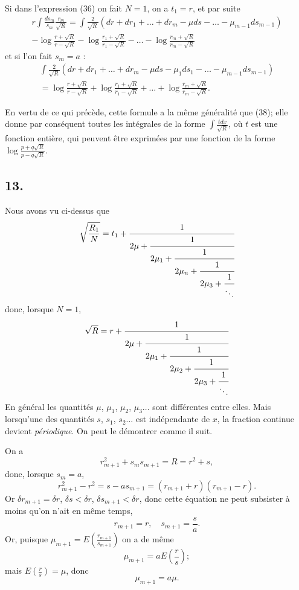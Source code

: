\documentclass[oneside, 12 pt, leqno]{memoir}
\begin{document}
Si dans l'expression (36) on fait \(N=1\), on a \(t_1=r\), et par suite
\[\tag{39}\begin{aligned}{r}
\int \frac{d s_m}{s_m} \frac{r_m}{\sqrt{R}} = \int \frac{2}{\sqrt{R}}\left(d r+d r_1+\dots+d r_m-\mu d s-\dots-\mu_{m-1} d s_{m-1}\right) \\
-\log \frac{r+\sqrt{R}}{r-\sqrt{R}}-\log \frac{r_1+\sqrt{R}}{r_1-\sqrt{R}}-\dots-\log \frac{r_m+\sqrt{R}}{r_m-\sqrt{R}}
\end{aligned}\]
et si l'on fait \(s_m=a\) :
\[\tag{40}\begin{gathered}
\int \frac{2}{\sqrt{{R}}}\left(d r+d r_1+\dots+d r_m-\mu d s-\mu_1 d s_1-\dots-\mu_{m-1} d s_{m-1}\right) \\
=\log \frac{r+\sqrt{R}}{r-\sqrt{R}}+\log \frac{r_1+\sqrt{R}}{r_1-\sqrt{R}}+\dots+\log \frac{r_m+\sqrt{R}}{r_m-\sqrt{R}}.
\end{gathered}\]

En vertu de ce qui précède, cette formule a la même généralité que (38); elle donne par conséquent toutes les intégrales de la forme \(\int \frac{t d x}{\sqrt{R}}\), où \(t\) est une fonction entière, qui peuvent être exprimées par une fonction de la forme \(\log \frac{p+q \sqrt{R}}{p-q \sqrt{R}}\).

\subsection*{13.}

Nous avons vu ci-dessus que
\[\sqrt{\frac{R_1}{N}}=t_1+\cfrac{1}{2 \mu+\cfrac{1}{2 \mu_1+\cfrac{1}{2 \mu_n+\cfrac{1}{2 \mu_3+\cfrac{1}{\ddots}}}}}\]
donc, lorsque \(N=1\),
\[\sqrt{R}=r+\cfrac{1}{2 \mu+\cfrac{1}{2 \mu_1+\cfrac{1}{2 \mu_2+\cfrac{1}{2 \mu_3+\cfrac{1}{\ddots}}}}}\]
En général les quantités \(\mu\), \(\mu_1\), \(\mu_2\), \(\mu_3 \dots\) sont différentes entre elles. Mais lorsqu'une des quantités \(s\), \(s_1\), \(s_2 \dots\) est indépendante de \(x\), la fraction continue devient \textit{périodique}. On peut le démontrer comme il suit.

On a
\[r_{m+1}^2+s_m s_{m+1}=R=r^2+s,\]
donc, lorsque \(s_m=a\),
\[r_{m+1}^2-r^2=s-a s_{m+1}=\left(r_{m+1}+r\right)\left(r_{m+1}-r\right).\]
Or \(\delta r_{m+1}=\delta r\), \(\delta s<\delta r\), \(\delta s_{m+1}<\delta r\), donc cette équation ne peut subsister à moins qu'on n'ait en même temps,
\[r_{m+1}=r, \quad s_{m+1}=\frac{s}{a}.\]
Or, puisque \(\mu_{m+1}=E\left(\frac{r_{m+1}}{s_{m+1}}\right)\) on a de même
\[\mu_{m+1}=a E\left(\frac{r}{s}\right);\]
mais \(E\left(\frac{r}{s}\right)=\mu\), donc
\[\mu_{m+1}=a \mu .\]
\end{document}
